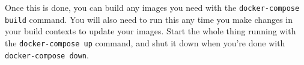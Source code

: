 \documentclass{article}
\begin{document}
Once this is done, you can build any images you need with the \texttt{docker-compose build} command. You will also need to run this any time you make changes in your build contexts to update your images. Start the whole thing running with the \texttt{docker-compose up} command, and shut it down when you're done with \texttt{docker-compose down}.
\end{document}
